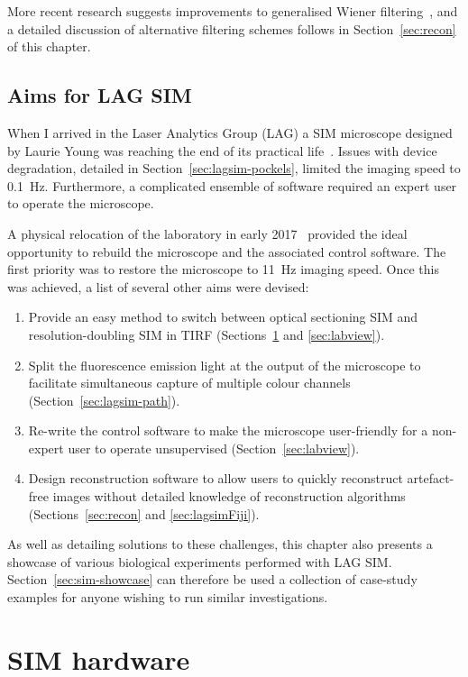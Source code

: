 More recent research suggests improvements to generalised Wiener filtering~\cite{righolt2013image, perez2016optimal, chakrova2016deconvolution}, and a detailed discussion of alternative filtering schemes follows in Section~\ref{sec:recon} of this chapter.


\subsection{Aims for LAG SIM}
When I arrived in the Laser Analytics Group (LAG) a SIM microscope designed by Laurie Young was reaching the end of its practical life~\cite{young2016guide}.
Issues with device degradation, detailed in Section~\ref{sec:lagsim-pockels}, limited the imaging speed to \SI{0.1}{\hertz}.
Furthermore, a complicated ensemble of software required an expert user to operate the microscope.

A physical relocation of the laboratory in early 2017~\cite{newbuilding} provided the ideal opportunity to rebuild the microscope and the associated control software. The first priority was to restore the microscope to \SI{11}{\hertz} imaging speed. Once this was achieved, a list of several other aims were devised:
\begin{enumerate}
	\item Provide an easy method to switch between optical sectioning SIM and resolution-doubling SIM in TIRF (Sections~\ref{sec:hardware} and \ref{sec:labview}).
	\item Split the fluorescence emission light at the output of the microscope to facilitate simultaneous capture of multiple colour channels (Section~\ref{sec:lagsim-path}).
	\item Re-write the control software to make the microscope user-friendly for a non-expert user to operate unsupervised (Section~\ref{sec:labview}).
	\item Design reconstruction software to allow users to quickly reconstruct artefact-free images without detailed knowledge of reconstruction algorithms (Sections~\ref{sec:recon} and \ref{sec:lagsimFiji}).
\end{enumerate}

As well as detailing solutions to these challenges, this chapter also presents a showcase of various biological experiments performed with LAG SIM.
Section~\ref{sec:sim-showcase} can therefore be used a collection of case-study examples for anyone wishing to run similar investigations.
\clearpage

\section{SIM hardware} \label{sec:hardware}
